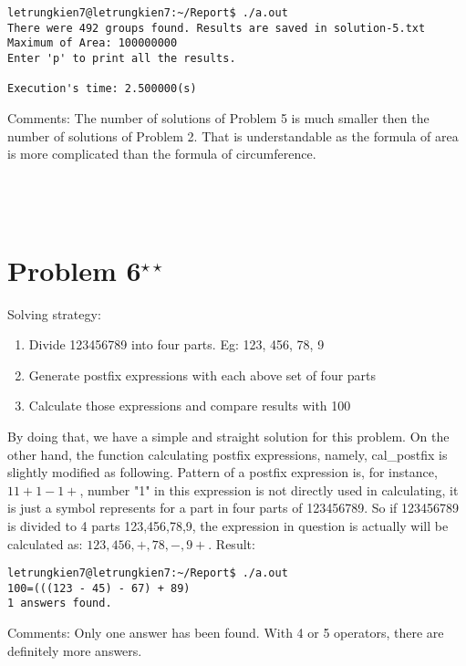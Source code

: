 \documentclass[11pt]{article}
\begin{document}
\begin{verbatim}
letrungkien7@letrungkien7:~/Report$ ./a.out 
There were 492 groups found. Results are saved in solution-5.txt
Maximum of Area: 100000000
Enter 'p' to print all the results.

Execution's time: 2.500000(s)
\end{verbatim}
Comments: The number of solutions of Problem 5 is much smaller then the number of solutions of Problem 2. That is understandable as the formula of area is more complicated than the formula of circumference.
\\ \\ \\ \\
\section{Problem 6${}^{\star\star}$}
\indent Solving strategy:
\begin{enumerate}
\item Divide 123456789 into four parts. Eg: 123, 456, 78, 9
\item Generate postfix expressions with each above set of four parts
\item Calculate those expressions and compare results with 100
\end{enumerate}
\indent By doing that, we have a simple and straight solution for this problem. On the other hand, the function calculating postfix expressions, namely, cal\_postfix is slightly modified as following. Pattern of a postfix expression is, for instance, $11+1-1+$, number "1" in this expression is not directly used in calculating, it is just a symbol represents for a part in four parts of 123456789. So if 123456789 is divided to 4 parts 123,456,78,9, the expression in question is actually will be calculated as: $123,456,+,78,-,9+$. Result:
%

\begin{verbatim}
letrungkien7@letrungkien7:~/Report$ ./a.out 
100=(((123 - 45) - 67) + 89)
1 answers found.
\end{verbatim}
Comments: Only one answer has been found. With 4 or 5 operators, there are definitely more answers.
\newpage
\end{document}
